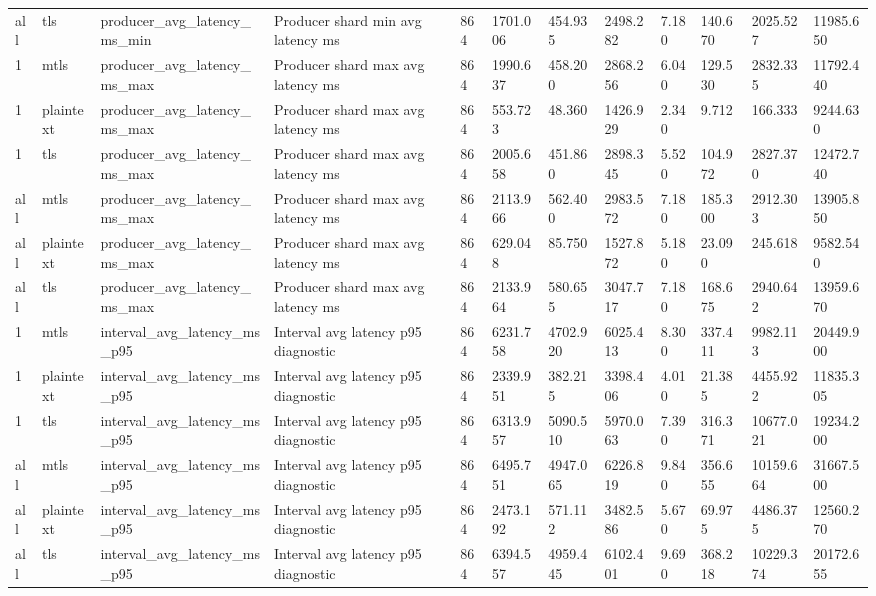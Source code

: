 \begin{longtable}{llllllllllll}
all & tls & producer\_avg\_latency\_ms\_min & Producer shard min avg latency ms & 864 & 1701.006 & 454.935 & 2498.282 & 7.180 & 140.670 & 2025.527 & 11985.650 \\
1 & mtls & producer\_avg\_latency\_ms\_max & Producer shard max avg latency ms & 864 & 1990.637 & 458.200 & 2868.256 & 6.040 & 129.530 & 2832.335 & 11792.440 \\
1 & plaintext & producer\_avg\_latency\_ms\_max & Producer shard max avg latency ms & 864 & 553.723 & 48.360 & 1426.929 & 2.340 & 9.712 & 166.333 & 9244.630 \\
1 & tls & producer\_avg\_latency\_ms\_max & Producer shard max avg latency ms & 864 & 2005.658 & 451.860 & 2898.345 & 5.520 & 104.972 & 2827.370 & 12472.740 \\
all & mtls & producer\_avg\_latency\_ms\_max & Producer shard max avg latency ms & 864 & 2113.966 & 562.400 & 2983.572 & 7.180 & 185.300 & 2912.303 & 13905.850 \\
all & plaintext & producer\_avg\_latency\_ms\_max & Producer shard max avg latency ms & 864 & 629.048 & 85.750 & 1527.872 & 5.180 & 23.090 & 245.618 & 9582.540 \\
all & tls & producer\_avg\_latency\_ms\_max & Producer shard max avg latency ms & 864 & 2133.964 & 580.655 & 3047.717 & 7.180 & 168.675 & 2940.642 & 13959.670 \\
1 & mtls & interval\_avg\_latency\_ms\_p95 & Interval avg latency p95 diagnostic & 864 & 6231.758 & 4702.920 & 6025.413 & 8.300 & 337.411 & 9982.113 & 20449.900 \\
1 & plaintext & interval\_avg\_latency\_ms\_p95 & Interval avg latency p95 diagnostic & 864 & 2339.951 & 382.215 & 3398.406 & 4.010 & 21.385 & 4455.922 & 11835.305 \\
1 & tls & interval\_avg\_latency\_ms\_p95 & Interval avg latency p95 diagnostic & 864 & 6313.957 & 5090.510 & 5970.063 & 7.390 & 316.371 & 10677.021 & 19234.200 \\
all & mtls & interval\_avg\_latency\_ms\_p95 & Interval avg latency p95 diagnostic & 864 & 6495.751 & 4947.065 & 6226.819 & 9.840 & 356.655 & 10159.664 & 31667.500 \\
all & plaintext & interval\_avg\_latency\_ms\_p95 & Interval avg latency p95 diagnostic & 864 & 2473.192 & 571.112 & 3482.586 & 5.670 & 69.975 & 4486.375 & 12560.270 \\
all & tls & interval\_avg\_latency\_ms\_p95 & Interval avg latency p95 diagnostic & 864 & 6394.557 & 4959.445 & 6102.401 & 9.690 & 368.218 & 10229.374 & 20172.655 \\

\end{longtable}
